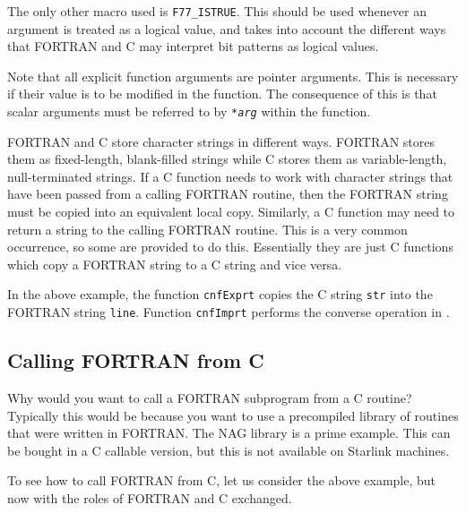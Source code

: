 \documentclass[twoside,11pt,nolof]{starlink}
\begin{document}
The only other macro used is \texttt{F77\_\-ISTRUE}.
This should be used whenever an argument is treated as a logical value, and
takes into account the different ways that FORTRAN and C may interpret bit
patterns as logical values.

Note that all explicit function arguments are pointer arguments. This is
necessary if their value is to be modified in the function. The consequence of
this is that scalar arguments must be referred to by \texttt{*\textit{arg}}\/
within the function.

FORTRAN and C store character strings in different ways. FORTRAN stores them as
fixed-length, blank-filled strings while C stores them as variable-length,
null-terminated strings.
If a C function needs to work with character strings that
have been passed from a calling FORTRAN routine, then the FORTRAN string must
be copied into an equivalent local copy. Similarly, a C function may need to
return a string to the calling FORTRAN routine. This is a very common
occurrence, so some
are provided to do this.
Essentially they are just C functions which copy a FORTRAN string to a C
string and vice versa.

In the above example, the function \texttt{cnfExprt} copies the C string
\texttt{str} into the FORTRAN string \texttt{line}. Function \texttt{cnfImprt}
performs the converse operation in
.

\subsection{\label{f_from_c}Calling FORTRAN from C}

Why would you want to call a FORTRAN subprogram from a C routine? Typically
this would be because you want to use a precompiled library of routines that
were written in FORTRAN\@. The NAG library is a prime example.
This can be bought in a C callable version, but this is not available on
Starlink machines.

To see how to call FORTRAN from C, let us consider the above example, but now
with the roles of FORTRAN and C exchanged.
\end{document}
